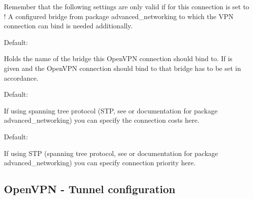   Remember that the following settings are only valid if for this connection 
   is set to ! A 
  configured bridge from package advanced\_networking to which the VPN 
  connection can bind is needed additionally.

\begin{description}


  Default: 

  Holds the name of the bridge this OpenVPN connection should bind to. If 
   is given and the OpenVPN connection 
  should bind to that bridge  has to be set in accordance.


  Default: 

  If using spanning tree protocol (STP, see  
  or documentation for package advanced\_networking) you can specify the connection 
  costs here.
  

  Default: 

  If using STP (spanning tree protocol, see  
  or documentation for package advanced\_networking) you can specify connection 
  priority here.

\end{description}

\subsection{OpenVPN - Tunnel configuration}

